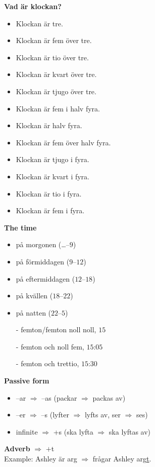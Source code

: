 
\begin{flushleft}
    \textbf{Vad är klockan?}
    \begin{itemize}
        \item Klockan är tre.
        \item Klockan är fem över tre.
        \item Klockan är tio över tre.
        \item Klockan är kvart över tre.
        \item Klockan är tjugo över tre.
        \item Klockan är fem i halv fyra.
        \item Klockan är halv fyra.
        \item Klockan är fem över halv fyra.
        \item Klockan är tjugo i fyra.
        \item Klockan är kvart i fyra.
        \item Klockan är tio i fyra.
        \item Klockan är fem i fyra.
    \end{itemize}

    \textbf{The time}
    \begin{itemize}
        \item på morgonen (\ldots --$9$)
        \item på förmiddagen ($9$--$12$)
        \item på eftermiddagen ($12$--$18$)
        \item på kvällen ($18$--$22$)
        \item på natten ($22$--$5$)
        \item[-] femton/femton noll noll, $15$
        \item[-] femton och noll fem, $15$:$05$
        \item[-] femton och trettio, $15$:$30$
    \end{itemize}

    \textbf{Passive form}
    \begin{itemize}
        \item --ar $\Rightarrow$ --as (packar $\Rightarrow$ packas av)
        \item --er $\Rightarrow$ --s (lyfter $\Rightarrow$ lyfts av, ser $\Rightarrow$ ses)
        \item infinite $\Rightarrow$ +s (ska lyfta $\Rightarrow$ ska lyftas av)
    \end{itemize}

    \textbf{Adverb} $\Rightarrow$ $+$t \\
    Example: Ashley är arg $\Rightarrow$ frågar Ashley arg\underline{t}.
\end{flushleft}


